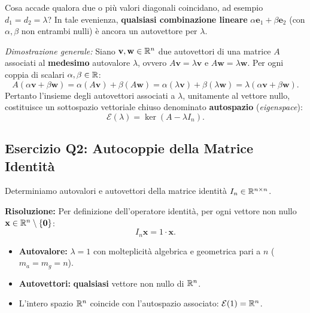 \begin{property}
Cosa accade qualora due o pi\`u valori diagonali coincidano, ad esempio $d_1 = d_2 = \lambda$?
In tale evenienza, \textbf{qualsiasi combinazione lineare} $\alpha \mathbf{e}_1 + \beta \mathbf{e}_2$ (con $\alpha, \beta$ non entrambi nulli) \`e ancora un autovettore per $\lambda$.

\medskip
\noindent\textit{Dimostrazione generale:} Siano $\mathbf{v}, \mathbf{w} \in \mathbb{R}^n$ due autovettori di una matrice $A$ associati al \textbf{medesimo} autovalore $\lambda$, ovvero $A\mathbf{v} = \lambda \mathbf{v}$ e $A\mathbf{w} = \lambda \mathbf{w}$. Per ogni coppia di scalari $\alpha, \beta \in \mathbb{R}$:
\begin{equation}
    A(\alpha \mathbf{v} + \beta \mathbf{w}) = \alpha (A\mathbf{v}) + \beta (A\mathbf{w}) = \alpha (\lambda \mathbf{v}) + \beta (\lambda \mathbf{w}) = \lambda (\alpha \mathbf{v} + \beta \mathbf{w}).
\end{equation}
Pertanto l'insieme degli autovettori associati a $\lambda$, unitamente al vettore nullo, costituisce un sottospazio vettoriale chiuso denominato \textbf{autospazio} (\textit{eigenspace}):
\begin{equation}
    \mathcal{E}(\lambda) = \ker(A - \lambda I_n).
\end{equation}
\end{property}

\subsection{Esercizio Q2: Autocoppie della Matrice Identit\`a}

\begin{example}
\label{ex:q2-matrice-identita}
Determiniamo autovalori e autovettori della matrice identit\`a $I_n \in \mathbb{R}^{n \times n}$.

\noindent\textbf{Risoluzione:}
Per definizione dell'operatore identit\`a, per ogni vettore non nullo $\mathbf{x} \in \mathbb{R}^n \setminus \{\mathbf{0}\}$:
\begin{equation}
    I_n \mathbf{x} = 1 \cdot \mathbf{x}.
\end{equation}
\begin{itemize}
    \item \textbf{Autovalore:} $\lambda = 1$ con molteplicit\`a algebrica e geometrica pari a $n$ ($m_a = m_g = n$).
    \item \textbf{Autovettori:} \textbf{qualsiasi} vettore non nullo di $\mathbb{R}^n$.
    \item L'intero spazio $\mathbb{R}^n$ coincide con l'autospazio associato: $\mathcal{E}(1) = \mathbb{R}^n$.
\end{itemize}
\end{example}

